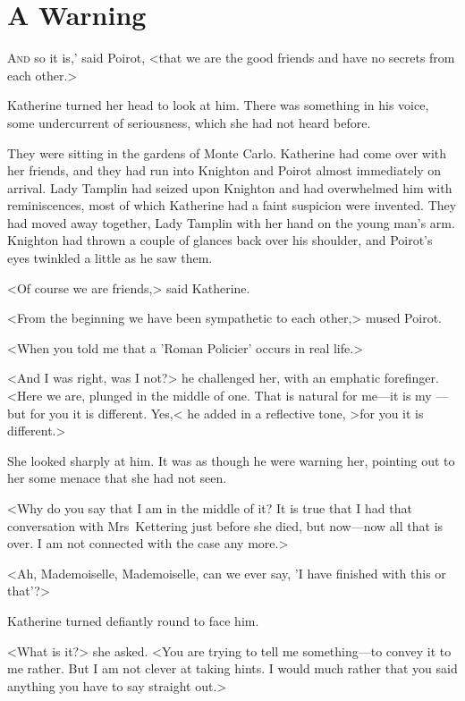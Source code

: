 \chapter{A Warning}



\lettrine[ante=`]{A}{nd}  so it is,' said Poirot, <that we are the good friends and have no secrets from each other.>

\zz
Katherine turned her head to look at him. There was something in his voice, some undercurrent of seriousness, which she had not heard before.

They were sitting in the gardens of Monte Carlo. Katherine had come over with her friends, and they had run into Knighton and Poirot almost immediately on arrival. Lady Tamplin had seized upon Knighton and had overwhelmed him with reminiscences, most of which Katherine had a faint suspicion were invented. They had moved away together, Lady Tamplin with her hand on the young man's arm. Knighton had thrown a couple of glances back over his shoulder, and Poirot's eyes twinkled a little as he saw them.

<Of course we are friends,> said Katherine.

<From the beginning we have been sympathetic to each other,> mused Poirot.

<When you told me that a 'Roman Policier' occurs in real life.>

<And I was right, was I not?> he challenged her, with an emphatic forefinger. <Here we are, plunged in the middle of one. That is natural for me—it is my —but for you it is different. Yes,< he added in a reflective tone, >for you it is different.>

She looked sharply at him. It was as though he were warning her, pointing out to her some menace that she had not seen.

<Why do you say that I am in the middle of it? It is true that I had that conversation with Mrs~Kettering just before she died, but now—now all that is over. I am not connected with the case any more.>

<Ah, Mademoiselle, Mademoiselle, can we ever say, 'I have finished with this or that'?>

Katherine turned defiantly round to face him.

<What is it?> she asked. <You are trying to tell me something—to convey it to me rather. But I am not clever at taking hints. I would much rather that you said anything you have to say straight out.>

